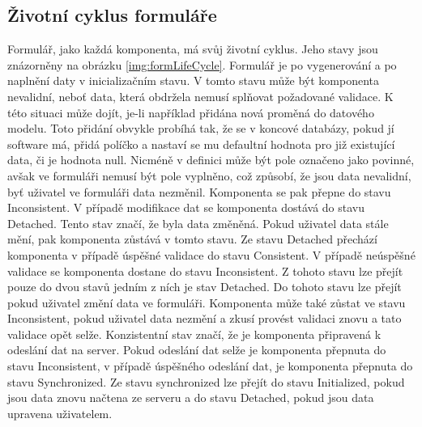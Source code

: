 \subsection{Životní cyklus formuláře}
Formulář, jako každá komponenta, má svůj životní cyklus. Jeho stavy jsou znázorněny na obrázku \ref{img:formLifeCycle}. Formulář je po vygenerování a po naplnění daty v inicializačním stavu. V tomto stavu může být komponenta nevalidní, neboť data, která obdržela nemusí splňovat požadované validace. K této situaci může dojít, je-li například přidána nová proměná do datového modelu. Toto přidání obvykle probíhá tak, že se v koncové databázy, pokud jí software má, přidá políčko a nastaví se mu defaultní hodnota pro již existující data, či je hodnota null. Nicméně v definici může být pole označeno jako povinné, avšak ve formuláři nemusí být pole vyplněno, což způsobí, že jsou data nevalidní, byť uživatel ve formuláři data nezměnil. Komponenta se pak přepne do stavu Inconsistent. V případě modifikace dat se komponenta dostává do stavu Detached. Tento stav značí, že byla data změněná. Pokud uživatel data stále mění, pak komponenta zůstává v tomto stavu. Ze stavu Detached přechází komponenta v případě úspěšné validace do stavu Consistent. V případě neúspěšné validace se komponenta dostane do stavu Inconsistent. Z tohoto stavu lze přejít pouze do dvou stavů jedním z ních je stav Detached. Do tohoto stavu lze přejít pokud uživatel změní data ve formuláři. Komponenta může také zůstat ve stavu Inconsistent, pokud uživatel data nezmění a zkusí provést validaci znovu a tato validace opět selže. Konzistentní stav značí, že je komponenta připravená k odeslání dat na server. Pokud odeslání dat selže je komponenta přepnuta do stavu Inconsistent, v případě úspěšného odeslání dat, je komponenta přepnuta do stavu Synchronized. Ze stavu synchronized lze přejít do stavu Initialized, pokud jsou data znovu načtena ze serveru a do stavu Detached, pokud jsou data upravena uživatelem.

